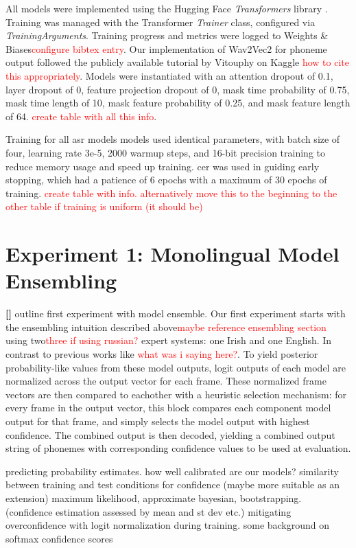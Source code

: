 \documentclass[thesis]{cluu}
\newcounter{paranum}
\newcommand{\numberedparagraph}{\par\refstepcounter{paranum}\textbf{[\theparanum] }}
\newcommand{\todo}[1]{\textcolor{red}{#1}}
\begin{document}
All models were implemented using the Hugging Face \textit{Transformers} library \parencite{wolfTransformersStateoftheArtNatural2020}. Training was managed with the Transformer \textit{Trainer} class, configured via \textit{TrainingArguments}. Training progress and metrics were logged to Weights \& Biases\todo{configure bibtex entry}. Our implementation of Wav2Vec2 for phoneme output followed the publicly available tutorial by Vitouphy on Kaggle \todo{how to cite this appropriately}. Models were instantiated with an attention dropout of 0.1, layer dropout of 0, feature projection dropout of 0, mask time probability of 0.75, mask time length of 10, mask feature probability of 0.25, and mask feature length of 64. \todo{create table with all this info}.

Training for all \gls{asr} models models used identical parameters, with batch size of four, learning rate 3e-5, 2000 warmup steps, and 16-bit precision training to reduce memory usage and speed up training. \gls{cer} was used in guiding early stopping, which had a patience of 6 epochs with a maximum of 30 epochs of training. \todo{create table with info. alternatively move this to the beginning to the other table if training is uniform (it should be)}

\section{Experiment 1: Monolingual Model Ensembling} \label{ex:1}
\numberedparagraph{outline first experiment with model ensemble.}
Our first experiment starts with the ensembling intuition described above\todo{maybe reference ensembling section} using two\todo{three if using russian?} expert systems: one Irish and one English. In contrast to previous works like \textcite{dengEnsembleDeepLearning2014}\todo{what was i saying here?}. To yield posterior probability-like values from these model outputs, logit outputs of each model are normalized across the output vector for each frame. These normalized frame vectors are then compared to eachother with a heuristic selection mechanism: for every frame in the output vector, this block compares each component model output for that frame, and simply selects the model output with highest confidence. The combined output is then decoded, yielding a combined output string of phonemes with corresponding confidence values to be used at evaluation.

\textcite{guoCalibrationModernNeural2017} predicting probability estimates. how well calibrated are our models?
\textcite{niehuesModelingConfidenceSequencetoSequence2019} similarity between training and test conditions for confidence (maybe more suitable as an extension)
\textcite{papadopoulosConfidenceEstimationMethods2001} maximum likelihood, approximate bayesian, bootstrapping. (confidence estimation assessed by mean and st dev etc.)
\textcite{weiMitigatingNeuralNetwork2022} mitigating overconfidence with logit normalization during training. some background on softmax confidence scores
\end{document}
